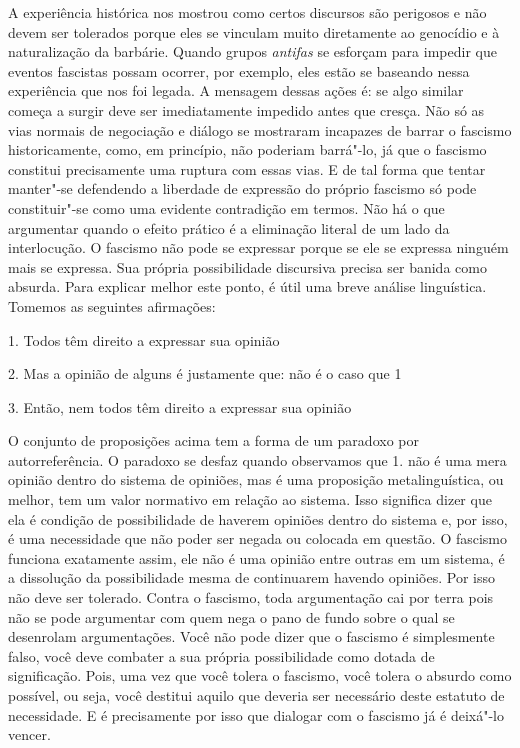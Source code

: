 A experiência histórica nos mostrou como certos discursos são perigosos
e não devem ser tolerados porque eles se vinculam muito diretamente ao
genocídio e à naturalização da barbárie. Quando grupos \emph{antifas} se
esforçam para impedir que eventos fascistas possam ocorrer, por exemplo,
eles estão se baseando nessa experiência que nos foi legada. A mensagem
dessas ações é: se algo similar começa a surgir deve ser imediatamente
impedido antes que cresça. Não só as vias normais de negociação e
diálogo se mostraram incapazes de barrar o fascismo historicamente,
como, em princípio, não poderiam barrá"-lo, já que o fascismo constitui
precisamente uma ruptura com essas vias. E de tal forma que tentar
manter"-se defendendo a liberdade de expressão do próprio fascismo só
pode constituir"-se como uma evidente contradição em termos. Não há o que
argumentar quando o efeito prático é a eliminação literal de um lado da
interlocução. O fascismo não pode se expressar porque se ele se expressa
ninguém mais se expressa. Sua própria possibilidade discursiva precisa
ser banida como absurda. Para explicar melhor este ponto, é útil uma
breve análise linguística. Tomemos as seguintes afirmações:

1. Todos têm direito a expressar sua opinião

2. Mas a opinião de alguns é justamente que: não é o caso que 1

3. Então, nem todos têm direito a expressar sua opinião

O conjunto de proposições acima tem a forma de um paradoxo por
autorreferência. O paradoxo se desfaz quando observamos que 1. não é uma
mera opinião dentro do sistema de opiniões, mas é uma proposição
metalinguística, ou melhor, tem um valor normativo em relação ao
sistema. Isso significa dizer que ela é condição de possibilidade de
haverem opiniões dentro do sistema e, por isso, é uma necessidade que
não poder ser negada ou colocada em questão. O fascismo funciona
exatamente assim, ele não é uma opinião entre outras em um sistema, é a
dissolução da possibilidade mesma de continuarem havendo opiniões. Por
isso não deve ser tolerado. Contra o fascismo, toda argumentação cai por
terra pois não se pode argumentar com quem nega o pano de fundo sobre o
qual se desenrolam argumentações. Você não pode dizer que o fascismo é
simplesmente falso, você deve combater a sua própria possibilidade como
dotada de significação. Pois, uma vez que você tolera o fascismo, você
tolera o absurdo como possível, ou seja, você destitui aquilo que
deveria ser necessário deste estatuto de necessidade. E é precisamente
por isso que dialogar com o fascismo já é deixá"-lo vencer.


